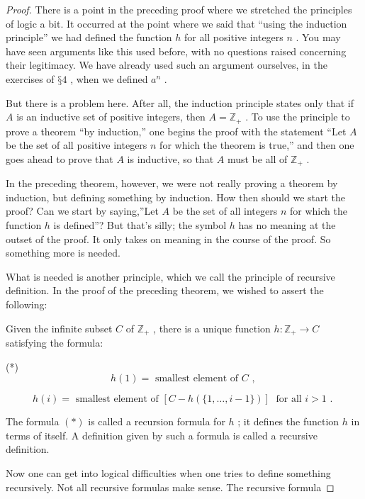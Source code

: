 \begin{theorem}
\begin{proof}
There is a point in the preceding proof where we stretched the principles of logic a bit. It occurred at the point where we said that ``using the induction principle'' we had defined the function \(h\) for all positive integers \(n\) . You may have seen arguments like this used before, with no questions raised concerning their legitimacy. We have already used such an argument ourselves, in the exercises of \(§4\) , when we defined \({a}^{n}\) .

But there is a problem here. After all, the induction principle states only that if \(A\) is an inductive set of positive integers, then \(A = {\mathbb{Z}}_{ + }\) . To use the principle to prove a theorem ``by induction,'' one begins the proof with the statement ``Let \(A\) be the set of all positive integers \(n\) for which the theorem is true,'' and then one goes ahead to prove that \(A\) is inductive, so that \(A\) must be all of \({\mathbb{Z}}_{ + }\) .

In the preceding theorem, however, we were not really proving a theorem by induction, but defining something by induction. How then should we start the proof? Can we start by saying,''Let \(A\) be the set of all integers \(n\) for which the function \(h\) is defined''? But that’s silly; the symbol \(h\) has no meaning at the outset of the proof. It only takes on meaning in the course of the proof. So something more is needed.

What is needed is another principle, which we call the principle of recursive definition. In the proof of the preceding theorem, we wished to assert the following:

Given the infinite subset \(C\) of \({\mathbb{Z}}_{ + }\) , there is a unique function \(h : {\mathbb{Z}}_{ + } \rightarrow  C\) satisfying the formula:

(*)
\[
h\left( 1\right)  = \text{ smallest element of }C\text{ , }
\]

\[
h\left( i\right)  = \text{ smallest element of }\left\lbrack  {C - h\left( {\{ 1,\ldots ,i - 1\} }\right) }\right\rbrack  \;\text{ for all }i > 1\text{ . }
\]

The formula \(\left( *\right)\) is called a recursion formula for \(h\) ; it defines the function \(h\) in terms of itself. A definition given by such a formula is called a recursive definition.

Now one can get into logical difficulties when one tries to define something recursively. Not all recursive formulas make sense. The recursive formula


\end{proof}
\end{theorem}
